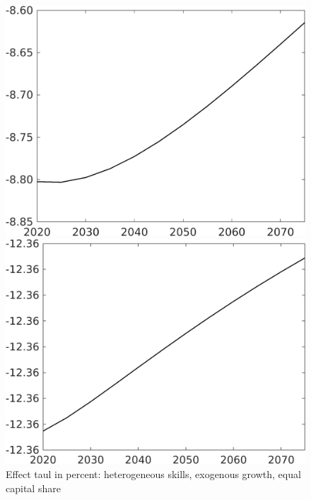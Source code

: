 \documentclass[12pt]{article}
\begin{document}
\begin{figure}[h!!]
	\centering
	\caption{Effect taul in percent: heterogeneous skills, exogenous growth, equal capital share }\label{fig:LF_BAU_nsk0_xgr1_equalcapShare}
	\begin{minipage}[]{0.32\textwidth}
		\includegraphics[width=1\textwidth]{../../codding_model/own_basedOnFried/optimalPol_010922_revision/figures/all_13Sept22/CompTaul_Equlab_LFBAUPer_Reg0_Emnet_spillover0_nsk0_xgr1_knspil0_sep1_countec0_GovRev0_etaa0.79.png}
	\end{minipage}	
	\begin{minipage}[]{0.32\textwidth}
		\includegraphics[width=1\textwidth]{../../codding_model/own_basedOnFried/optimalPol_010922_revision/figures/all_13Sept22/CompTaul_Equlab_LFBAUPer_Reg0_hh_spillover0_nsk0_xgr1_knspil0_sep1_countec0_GovRev0_etaa0.79.png}

\end{minipage}
\end{figure}
\end{document}

